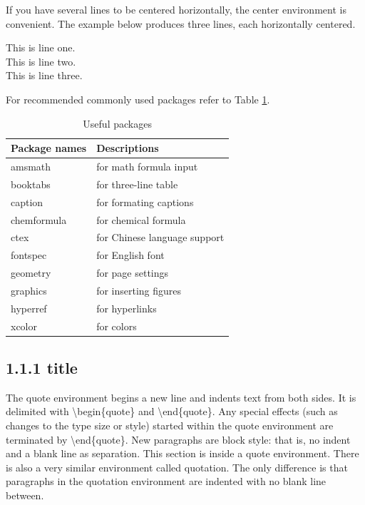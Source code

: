 \documentclass[12pt,openright]{book}
\begin{document}
If you have several lines to be centered horizontally, the center environment is convenient. The example below produces three lines, each horizontally centered.

\begin{center}
  This is line one. \\
  This is line two. \\
  This is line three.
\end{center}

\noindent For recommended commonly used packages refer to Table \ref{tab:useful packages}.

\begin{center}
  \begin{table}[!htbp]
    \caption{Useful packages}
    \label{tab:useful packages}
    \begin{tabular}{@{}p{}p{}@{}}
      \toprule
      \textbf{Package names} & \textbf{Descriptions}  \\ 
      \midrule
      amsmath	& for math formula input \\
      booktabs & for three-line table \\
      caption & for formating captions \\
      chemformula & for chemical formula \\
      ctex & for Chinese language support \\
      fontspec & for English font \\
      geometry & for page settings \\
      graphics & for inserting figures \\
      hyperref & for hyperlinks \\
      xcolor & for colors \\
      \bottomrule
    \end{tabular}
  \end{table}
\end{center}

\subsection{1.1.1 title}

The quote environment begins a new line and indents text from both sides. It is delimited with \textbackslash begin\{quote\} and \textbackslash end\{quote\}. Any special effects (such as changes to the type size or style) started within the quote environment
are terminated by \textbackslash end\{quote\}. New paragraphs are block style: that is, no indent and a blank line as separation. This section is inside a quote environment. There is also a very similar environment called quotation. The only difference is that paragraphs in the quotation environment are indented with no blank line between.
\end{document}
